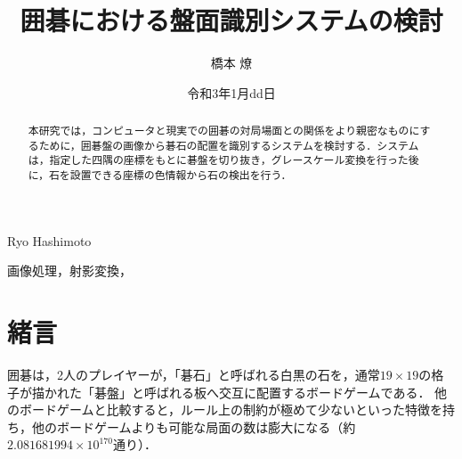 \documentclass[openright]{nitocs}
\numberwithin{equation}{section}
\begin{document}
    \title{囲碁における盤面識別システムの検討}  %
    \author{橋本 燎}{Ryo Hashimoto} %
    \date{令和3年1月dd日}   %

    \begin{abstract} %
        本研究では，コンピュータと現実での囲碁の対局場面との関係をより親密なものにするために，囲碁盤の画像から碁石の配置を識別するシステムを検討する．システムは，指定した四隅の座標をもとに碁盤を切り抜き，グレースケール変換を行った後に，石を設置できる座標の色情報から石の検出を行う．\\
    \end{abstract}

    \begin{keyword} %
        画像処理，射影変換，
    \end{keyword}


    \maketitle

    \section{緒言}  
    \label{sec:format}
        囲碁は，2人のプレイヤーが，「碁石」と呼ばれる白黒の石を，通常$19\times19$の格子が描かれた「碁盤」と呼ばれる板へ交互に配置するボードゲームである．
        他のボードゲームと比較すると，ルール上の制約が極めて少ないといった特徴を持ち，他のボードゲームよりも可能な局面の数は膨大になる（約$2.081681994 \times 10^{170}$通り\cite{numbers}）．
\end{document}
